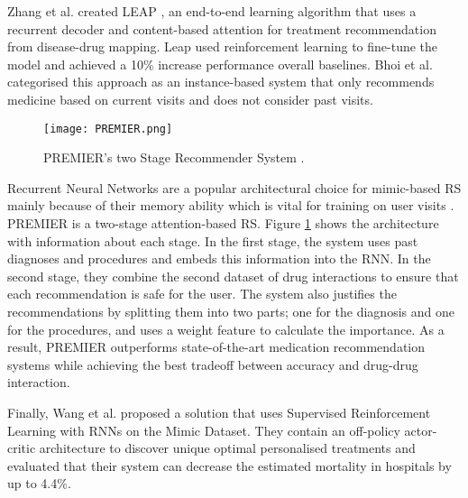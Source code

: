 Zhang et al. \cite{LEAP} created LEAP , an end-to-end learning algorithm that uses a
recurrent decoder and content-based attention for treatment recommendation from
disease-drug mapping. Leap used reinforcement learning to fine-tune the model
and achieved a 10\% increase performance overall baselines. Bhoi et al. 
\cite{Bhoi2021} categorised this approach as an instance-based system that
only recommends medicine based on current visits and does not consider past
visits. 

\begin{figure}
    \texttt{[image: PREMIER.png]}
    \caption{PREMIER's two Stage Recommender System \cite{Bhoi2021 as}.}
    \label{one}
\end{figure}

Recurrent Neural Networks are a popular architectural choice for mimic-based RS
mainly because of their memory ability which is vital for training on user
visits \cite{Wang}. PREMIER \cite{Bhoi2021} is a two-stage attention-based
RS. Figure \ref{one} shows the architecture with information about each stage. In
the first stage, the system uses past diagnoses and procedures and embeds
this information into the RNN. In the second stage, they combine the
second dataset of drug interactions to ensure that each recommendation is
safe for the user. The system also justifies the recommendations by
splitting them into two parts; one for the diagnosis and one for the
procedures, and uses a weight feature to calculate the importance. As a
result, PREMIER outperforms state-of-the-art medication recommendation
systems while achieving the best tradeoff between accuracy and drug-drug
interaction.  

Finally, Wang et al. \cite{Wang} proposed a solution that uses Supervised Reinforcement
Learning with RNNs on the Mimic Dataset. They contain an off-policy
actor-critic architecture to discover unique optimal personalised
treatments and evaluated that their system can decrease the estimated
mortality in hospitals by up to 4.4\%.

